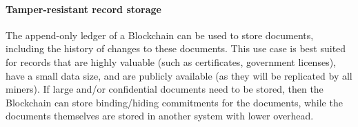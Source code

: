 %


\paragraph{Tamper-resistant record storage}
The append-only ledger of a Blockchain can be used to store documents, 
including the history of changes to these documents.
This use case is best suited for records that are highly valuable (such as certificates, government licenses), have a small data size, and are publicly available (as they will be replicated by all miners).
If large and/or confidential documents need to be stored, then the Blockchain can store binding/hiding commitments for the documents, while the documents themselves are stored in another system with lower overhead.



